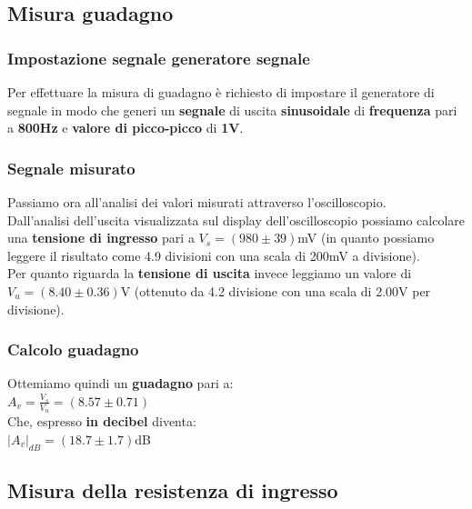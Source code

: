 \documentclass{article}
\begin{document}
\subsection{Misura guadagno}
\subsubsection{Impostazione segnale generatore segnale}
Per effettuare la misura di guadagno è richiesto di impostare il generatore di segnale in modo che generi un \textbf{segnale} di uscita \textbf{sinusoidale} di \textbf{frequenza} pari a \textbf{800Hz} e \textbf{valore di picco-picco} di \textbf{1V}.

\subsubsection{Segnale misurato}
Passiamo ora all'analisi dei valori misurati attraverso l'oscilloscopio.\\Dall'analisi dell'uscita visualizzata sul display dell'oscilloscopio possiamo calcolare una \textbf{tensione di ingresso} pari a \large $V_s = (980 \pm 39)$mV \normalsize (in quanto possiamo leggere il risultato come 4.9 divisioni con una scala di 200mV a divisione).\\
Per quanto riguarda la \textbf{tensione di uscita} invece leggiamo un valore di \large $V_u = (8.40 \pm 0.36)$V \normalsize (ottenuto da 4.2 divisione con una scala di 2.00V per divisione).
\subsubsection{Calcolo guadagno}
Ottemiamo quindi un \textbf{guadagno} pari a:\\ \large $A_v = \frac{V_s}{V_u} = (8.57 \pm 0.71)$ \normalsize \\Che, espresso \textbf{in decibel} diventa:\\ \large $ |A_v|_{dB} = (18.7 \pm 1.7)$dB \normalsize

\subsection{Misura della resistenza di ingresso}
\end{document}
